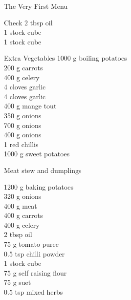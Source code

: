 \begin{menu}{The Very First Menu}
\begin{shoppinglist}{Check}
      2 tbsp oil \\ 
      1  stock cube \\ 
      1  stock cube \\ 
      \end{shoppinglist}%
      \begin{shoppinglist}{Extra Vegetables}
      1000 g boiling potatoes \\ 
      200 g carrots \\ 
      400 g celery \\ 
      4 cloves garlic \\ 
      4 cloves garlic \\ 
      400 g mange tout \\ 
      350 g onions \\ 
      700 g onions \\ 
      400 g onions \\ 
      1  red chillis \\ 
      1000 g sweet potatoes \\ 
      \end{shoppinglist}%
      \par\vfil %
    \vfil\clearpage
  
    \begin{recipe}{2}{Meat stew and dumplings}%
    
	
	
		\begin{ingredients}
		1200 g baking potatoes  \\
	320 g onions  \\
	400 g meat  \\
	400 g carrots  \\
	400 g celery  \\
	2 tbsp oil  \\
	75 g tomato puree  \\
	0.5 tsp chilli powder  \\
	1  stock cube  \\
	75 g self raising flour  \\
	75 g suet  \\
	0.5 tsp mixed herbs  \\
	
		\end{ingredients}
	

\end{recipe}
\end{menu}
